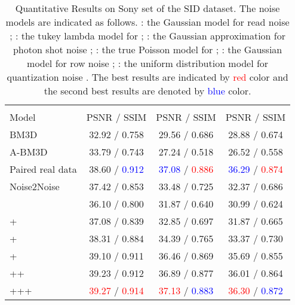 \documentclass[10pt,twocolumn,letterpaper]{article}
\begin{document}
\begin{table}[!t]
\centering
\caption{Quantitative Results on Sony set of the SID dataset. The noise models are indicated as follows. : the Gaussian model for read noise ; : the tukey lambda model for ; : the Gaussian approximation for photon shot noise ; : the true Poisson model for ;  : the Gaussian model for row noise ; : the uniform distribution model for quantization noise .
The best results are indicated by \textcolor{red}{red} color and the second best results are denoted by \textcolor{blue}{blue} color. }
\footnotesize
\begin{tabular}{lccc} 
		\toprule
		 &  &  &  \\
		Model & PSNR / SSIM & PSNR / SSIM & PSNR / SSIM \\ 
		\midrule
		BM3D  & 32.92 / 0.758 & 29.56 / 0.686 & 28.88 / 0.674 \\ \hline
		A-BM3D & 33.79 /  0.743 & 27.24 / 0.518 & 26.52 / 0.558 \\ \hline
		\midrule
		Paired real data  & 38.60 / \textcolor{blue}{0.912} & \textcolor{blue}{37.08} / \textcolor{red}{0.886} & \textcolor{blue}{36.29} / \textcolor{red}{0.874} \\ \hline
		Noise2Noise  & 37.42 / 0.853 & 33.48 / 0.725 & 32.37 / 0.686 \\ \hline
		\midrule
		  & 36.10 / 0.800 & 31.87 / 0.640 & 30.99 / 0.624 \\ \hline
		+  & 37.08 / 0.839 & 32.85 / 0.697 & 31.87 / 0.665 \\ \hline
		+  & 38.31 / 0.884 & 34.39 / 0.765 & 33.37 / 0.730 \\ \hline
		+  & 39.10 / 0.911 & 36.46 / 0.869 & 35.69 / 0.855 \\ \hline
		++  & 39.23 / 0.912 & 36.89 / 0.877 & 36.01 / 0.864 \\ \hline 
		+++  & \textcolor{red}{39.27} / \textcolor{red}{0.914} & \textcolor{red}{37.13} / \textcolor{blue}{0.883} & \textcolor{red}{36.30} / \textcolor{blue}{0.872} \\ \hline			
		
		\bottomrule
\end{tabular}
\label{tb:componet}
\end{table}
\end{document}
